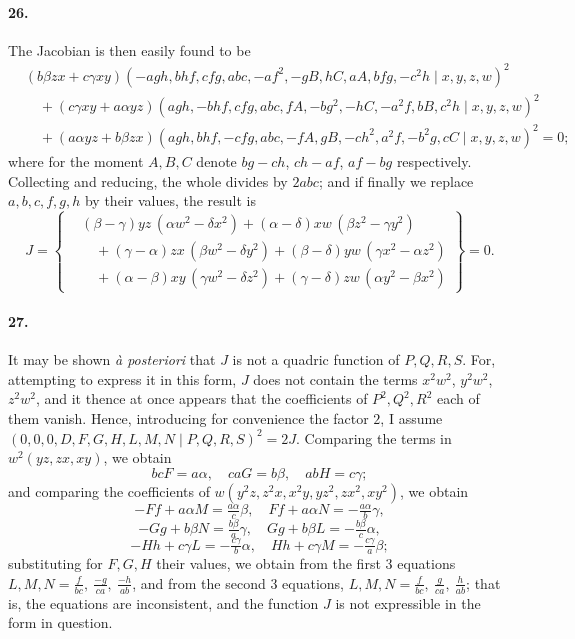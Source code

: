 \documentclass[11pt,a4paper]{article}
\begin{document}
\paragraph{26.}
The Jacobian is then easily found to be
\[
\begin{aligned}
& (b\beta zx + c\gamma xy)(-agh, bhf, cfg, abc, -af^2, -gB, hC, aA, bfg, -c^2 h  \mid x, y, z, w)^2 \\
& \quad + (c\gamma xy + a\alpha yz)(agh, -bhf, cfg, abc, fA, -bg^2, -hC, -a^2 f, bB, c^2 h  \mid x, y, z, w)^2 \\
& \quad + (a\alpha yz + b\beta zx)(agh, bhf, -cfg, abc, -fA, gB, -ch^2, a^2 f, -b^2 g, cC  \mid x, y, z, w)^2 = 0;
\end{aligned}
\]
where for the moment $A, B, C$ denote $bg - ch$, $ch - af$, $af - bg$ respectively.
Collecting and reducing, the whole divides by $2 abc$; and if finally we replace
$a, b, c, f, g, h$ by their values, the result is
\[
J = \left\{
\begin{aligned}
& (\beta - \gamma) yz\,(\alpha w^2 - \delta x^2) + (\alpha - \delta) xw\,(\beta z^2 - \gamma y^2) \\
& \quad + (\gamma - \alpha) zx\,(\beta w^2 - \delta y^2) + (\beta - \delta) yw\,(\gamma x^2 - \alpha z^2) \\
& \quad + (\alpha - \beta) xy\,(\gamma w^2 - \delta z^2) + (\gamma - \delta) zw\,(\alpha y^2 - \beta x^2)
\end{aligned}
\right\} = 0.
\]

\paragraph{27.}
It may be shown \textit{\`a posteriori} that $J$ is not a quadric function of $P, Q, R, S$.
For, attempting to express it in this form, $J$ does not contain the terms $x^2 w^2$,
$y^2 w^2$, $z^2 w^2$, and it thence at once appears that the coefficients of $P^2, Q^2, R^2$
each of them vanish. Hence, introducing for convenience the factor $2$, I assume
$(0, 0, 0, D, F, G, H, L, M, N  \mid P, Q, R, S)^2 = 2 J$. Comparing the terms in
$w^2(yz, zx, xy)$, we obtain
\[
bc F = a\alpha,\quad ca G = b\beta,\quad ab H = c\gamma;
\]
and comparing the coefficients of $w(y^2 z, z^2 x, x^2 y, yz^2, zx^2, xy^2)$, we obtain
\[
-F f + a\alpha M = \tfrac{a\alpha}{c}\beta,\quad F f + a\alpha N = -\tfrac{a\alpha}{b}\gamma,
\]
\[
-G g + b\beta N = \tfrac{b\beta}{a}\gamma,\quad G g + b\beta L = -\tfrac{b\beta}{c}\alpha,
\]
\[
-H h + c\gamma L = -\tfrac{c\gamma}{b}\alpha,\quad H h + c\gamma M = -\tfrac{c\gamma}{a}\beta;
\]
substituting for $F, G, H$ their values, we obtain from the first $3$ equations
$L, M, N = \tfrac{f}{bc},\ \tfrac{-g}{ca},\ \tfrac{-h}{ab}$, and from the second $3$
equations, $L, M, N = \tfrac{f}{bc},\ \tfrac{g}{ca},\ \tfrac{h}{ab}$; that is, the
equations are inconsistent, and the function $J$ is not expressible in the form in question.
\end{document}
